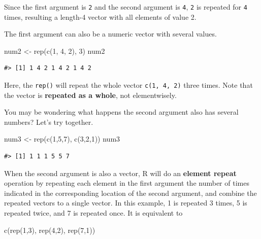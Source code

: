 \documentclass[
]{book}
\newenvironment{Shaded}{\begin{snugshade}}{\end{snugshade}}
\newcommand{\DecValTok}[1]{\textcolor[rgb]{0.00,0.00,0.81}{#1}}
\newcommand{\FunctionTok}[1]{\textcolor[rgb]{0.00,0.00,0.00}{#1}}
\newcommand{\NormalTok}[1]{#1}
\newcommand{\OtherTok}[1]{\textcolor[rgb]{0.56,0.35,0.01}{#1}}
\begin{document}
Since the first argument is \texttt{2} and the second argument is \texttt{4}, \texttt{2} is repeated for \texttt{4} times, resulting a length-4 vector with all elements of value 2.

The first argument can also be a numeric vector with several values.

\begin{Shaded}
\begin{Highlighting}[]
\NormalTok{num2 }\OtherTok{\textless{}{-}} \FunctionTok{rep}\NormalTok{(}\FunctionTok{c}\NormalTok{(}\DecValTok{1}\NormalTok{, }\DecValTok{4}\NormalTok{, }\DecValTok{2}\NormalTok{), }\DecValTok{3}\NormalTok{)}
\NormalTok{num2}
\end{Highlighting}
\end{Shaded}

\begin{verbatim}
#> [1] 1 4 2 1 4 2 1 4 2
\end{verbatim}

Here, the \texttt{rep()} will repeat the whole vector \texttt{c(1,\ 4,\ 2)} three times. Note that the vector is \textbf{repeated as a whole}, not elementwisely.

You may be wondering what happens the second argument also has several numbers? Let's try together.

\begin{Shaded}
\begin{Highlighting}[]
\NormalTok{num3 }\OtherTok{\textless{}{-}} \FunctionTok{rep}\NormalTok{(}\FunctionTok{c}\NormalTok{(}\DecValTok{1}\NormalTok{,}\DecValTok{5}\NormalTok{,}\DecValTok{7}\NormalTok{), }\FunctionTok{c}\NormalTok{(}\DecValTok{3}\NormalTok{,}\DecValTok{2}\NormalTok{,}\DecValTok{1}\NormalTok{))}
\NormalTok{num3}
\end{Highlighting}
\end{Shaded}

\begin{verbatim}
#> [1] 1 1 1 5 5 7
\end{verbatim}

When the second argument is also a vector, R will do an \textbf{element repeat} operation by repeating each element in the first argument the number of times indicated in the corresponding location of the second argument, and combine the repeated vectors to a single vector. In this example, 1 is repeated 3 times, 5 is repeated twice, and 7 is repeated once. It is equivalent to

\begin{Shaded}
\begin{Highlighting}[]
\FunctionTok{c}\NormalTok{(}\FunctionTok{rep}\NormalTok{(}\DecValTok{1}\NormalTok{,}\DecValTok{3}\NormalTok{), }\FunctionTok{rep}\NormalTok{(}\DecValTok{4}\NormalTok{,}\DecValTok{2}\NormalTok{), }\FunctionTok{rep}\NormalTok{(}\DecValTok{7}\NormalTok{,}\DecValTok{1}\NormalTok{))}
\end{Highlighting}
\end{Shaded}
\end{document}
